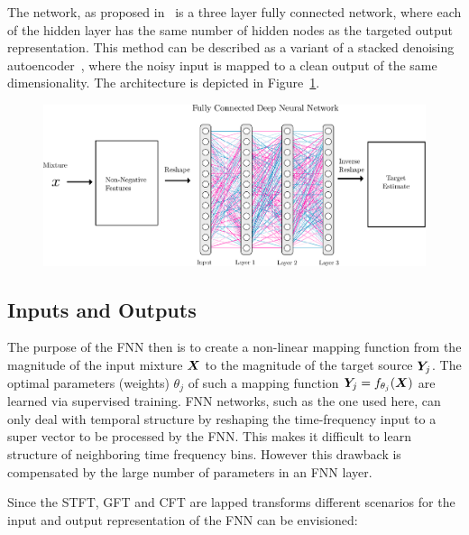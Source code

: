 \par
The network, as proposed in~\cite{uhlich15} is a three layer fully connected network, where each of the hidden layer has the same number of hidden nodes as the targeted output representation.
This method can be described as a variant of a stacked denoising autoencoder~\cite{pvincent08}, where the noisy input is mapped to a clean output of the same dimensionality.
The architecture is depicted in Figure~\ref{fig:cft_dnn}. 

\begin{figure}[ht!]
\centering
		\includegraphics[width=\textwidth]{Chapters/06_Separation_Unknown/figures/uhlich_dnn.pdf}
\caption{}
\label{fig:cft_dnn}
\end{figure}

\subsection{Inputs and Outputs}

The purpose of the FNN then is to create a non-linear mapping function from the magnitude of the input mixture \({\bm{X}}\) to the magnitude of the target source \({\bm{Y}}_j\).
The optimal parameters (weights) \(\theta_j\) of such a mapping function \({\bm{Y}}_j = f_{\theta_j}({\bm{X}})\) are learned via supervised training.
FNN networks, such as the one used here, can only deal with temporal structure by reshaping the time-frequency input to a super vector to be processed by the FNN.
This makes it difficult to learn structure of neighboring time frequency bins. 
However this drawback is compensated by the large number of parameters in an FNN layer.

Since the STFT, GFT and CFT are lapped transforms different scenarios for the input and output representation of the FNN can be envisioned:

